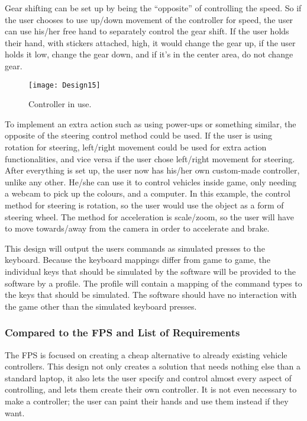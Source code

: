 \bigskip

Gear shifting can be set up by being the “opposite” of controlling the speed. So if the user chooses to use up/down movement of the controller for speed, the user can use his/her free hand to separately control the gear shift. If the user holds their hand, with stickers attached, high, it would change the gear up, if the user holds it low, change the gear down, and if it’s in the center area, do not change gear.

\begin{figure}[h]
\centering
\texttt{[image: Design15]}
\caption{Controller in use.}
\label{fig:design15}
\end{figure}

To implement an extra action such as using power-ups or something similar, the opposite of the steering control method could be used. If the user is using rotation for steering, left/right movement could be used for extra action functionalities, and vice versa if the user chose left/right movement for steering.
After everything is set up, the user now has his/her own custom-made controller, unlike any other. He/she can use it to control vehicles inside game, only needing a webcam to pick up the colours, and a computer. In this example, the control method for steering is rotation, so the user would use the object as a form of steering wheel. The method for acceleration is scale/zoom, so the user will have to move towards/away from the camera in order to accelerate and brake.
\bigskip

This design will output the users commands as simulated presses to the keyboard. 
Because the keyboard mappings differ from game to game, the individual keys that should be simulated by the software will be provided to the software by a profile.
The profile will contain a mapping of the command types to the keys that should be simulated. 
The software should have no interaction with the game other than the simulated keyboard presses.

\subsubsection*{Compared to the FPS and List of Requirements}
The FPS is focused on creating a cheap alternative to already existing vehicle controllers. This design not only creates a solution that needs nothing else than a standard laptop, it also lets the user specify and control almost every aspect of controlling, and lets them create their own controller. It is not even necessary to make a controller; the user can paint their hands and use them instead if they want.

